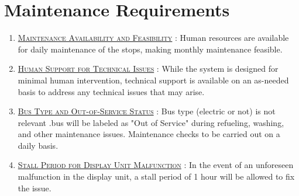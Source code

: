 \section{Maintenance Requirements}

\begin{enumerate}
    \item \underline{\textsc{Maintenance Availability and Feasibility}} : Human resources are available for daily maintenance of the stops, making monthly maintenance feasible.

    \item \underline{\textsc{Human Support for Technical Issues}} : While the system is designed for minimal human intervention, technical support is available on an as-needed basis to address any technical issues that may arise.

    \item \underline{\textsc{Bus Type and Out-of-Service Status}} : Bus type (electric or not) is not relevant .bus will be labeled as "Out of Service" during refueling, washing, and other maintenance issues. Maintenance checks to be carried out on a daily basis. 

    \item \underline{\textsc{Stall Period for Display Unit Malfunction}} : In the event of an unforeseen malfunction in the display unit, a stall period of 1 hour will be allowed to fix the issue.
\end{enumerate}
